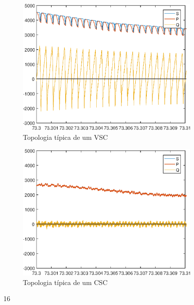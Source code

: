 \begin{figure}[!htb] %
	\centering
	\begin{subfigure}[b]{0.48\textwidth}
		\centering
		\includegraphics[width=\textwidth]{Cap4/Figuras/resultados_unfilt_16.eps}
		\caption{Topologia típica de um VSC} 
		\label{fig:resultados_unfilt_16.eps}
	\end{subfigure}%
		\hfill
	\begin{subfigure}[b]{0.48\textwidth}  
		\centering 
		\includegraphics[width=\textwidth]{Cap4/Figuras/resultados_filt_16.eps}
		\caption{Topologia típica de um CSC}    
		\label{fig:resultados_filt_16.eps}
	\end{subfigure}%
	\caption{16}
	\label{fig:16}
\end{figure}

